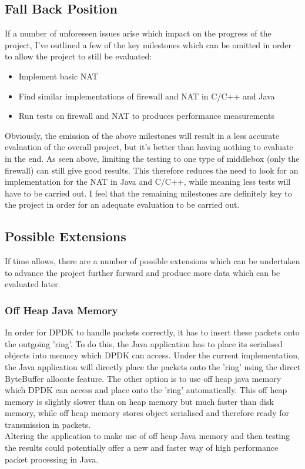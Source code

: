 \documentclass[interim_report.tex]{subfiles}
\begin{document}
\subsection{Fall Back Position}
If a number of unforeseen issues arise which impact on the progress of the project, I've outlined a few of the key milestones which can be omitted in order to allow the project to still be evaluated:
\begin{itemize}
	\item Implement basic NAT
	\item Find similar implementations of firewall and NAT in C/C++ and Java
	\item Run tests on firewall and NAT to produces performance measurements
\end{itemize}
Obviously, the emission of the above milestones will result in a less accurate evaluation of the overall project, but it's better than having nothing to evaluate in the end. As seen above, limiting the testing to one type of middlebox (only the firewall) can still give good results. This therefore reduces the need to look for an implementation for the NAT in Java and C/C++, while meaning less tests will have to be carried out. I feel that the remaining milestones are definitely key to the project in order for an adequate evaluation to be carried out.

\subsection{Possible Extensions}
If time allows, there are a number of possible extensions which can be undertaken to advance the project further forward and produce more data which can be evaluated later.

\subsubsection{Off Heap Java Memory}
In order for DPDK to handle packets correctly, it has to insert these packets onto the outgoing 'ring'. To do this, the Java application has to place its serialised objects into memory which DPDK can access. Under the current implementation, the Java application will directly place the packets onto the 'ring' using the direct ByteBuffer allocate feature. The other option is to use off heap java memory which DPDK can access and place onto the 'ring' automatically. This off heap memory is slightly slower than on heap memory but much faster than disk memory, while off heap memory stores object serialised and therefore ready for transmission in packets. \\
\newline
Altering the application to make use of off heap Java memory and then testing the results could potentially offer a new and faster way of high performance packet processing in Java.
\end{document}
